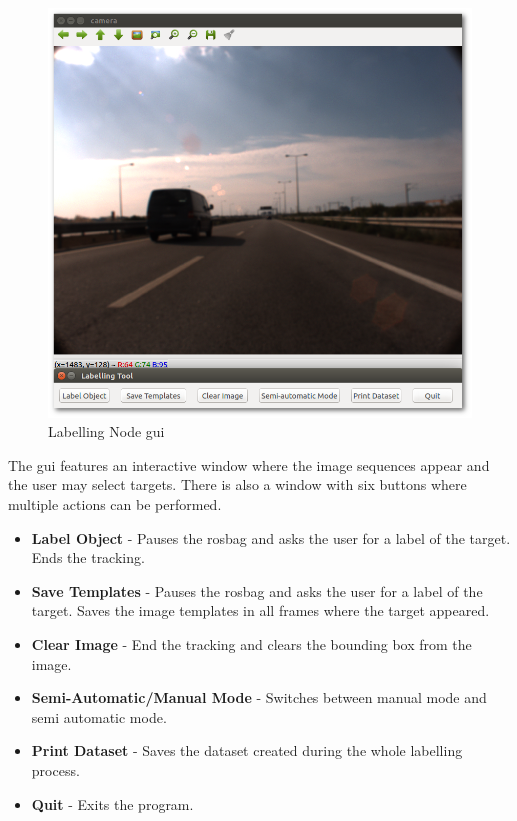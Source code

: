 \begin{figure}[htp]
	\centering
	\includegraphics[width=.99\textwidth]{caplabel/imgs/labellinggui.png}
	\caption{Labelling Node \gls{gui}}
	\label{fig:labellinggui}	
\end{figure}

The \gls{gui} features an interactive window where the image sequences appear and the user may select targets. There is also a window with six buttons where multiple actions can be performed.

\begin{itemize}
\item \textbf{Label Object} - Pauses the rosbag and asks the user for a label of the target. Ends the tracking.
\item \textbf{Save Templates} - Pauses the rosbag and asks the user for a label of the target. Saves the image templates in all frames where the target appeared.
\item \textbf{Clear Image} - End the tracking and clears the bounding box from the image.
\item \textbf{Semi-Automatic/Manual Mode} - Switches between manual mode and semi automatic mode.
\item \textbf{Print Dataset} - Saves the dataset created during the whole labelling process.
\item \textbf{Quit} - Exits the program.
\end{itemize}


